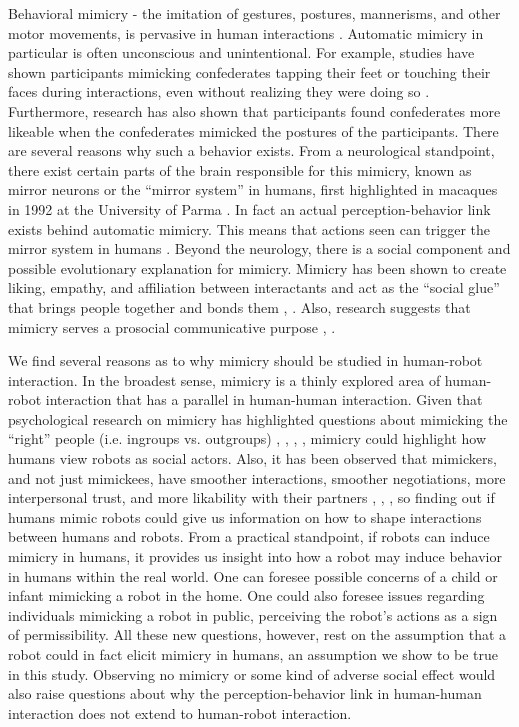 \documentclass{acm_proc_article-sp}
\begin{document}
Behavioral mimicry - the imitation of gestures, postures, mannerisms, and other motor movements, is pervasive in human interactions \cite{chartrand2013antecedents}. Automatic mimicry in particular is often unconscious and unintentional. For example, studies have shown participants mimicking confederates tapping their feet or touching their faces during interactions, even without realizing they were doing so \cite{chartrand1999chameleon}. Furthermore, research has also shown that participants found confederates more likeable when the confederates mimicked the postures of the participants. There are several reasons why such a behavior exists. From a neurological standpoint, there exist certain parts of the brain responsible for this mimicry, known as mirror neurons or the ``mirror system'' in humans, first highlighted in macaques in 1992 at the University of Parma \cite{ehrenfeld2011reflections}. In fact an actual perception-behavior link exists behind automatic mimicry. This means that actions seen can trigger the mirror system in humans \cite{chartrand1999chameleon}. Beyond the neurology, there is a social component and possible evolutionary explanation for mimicry. Mimicry has been shown to create liking, empathy, and affiliation between interactants and act as the ``social glue'' that brings people together and bonds them \cite{chartrand2013antecedents}, \cite{lakin2003chameleon}. Also, research suggests that mimicry serves a prosocial communicative purpose \cite{bavelas1986show}, \cite{chartrand2013antecedents}.

We find several reasons as to why mimicry should be studied in human-robot interaction. In the broadest sense, mimicry is a thinly explored area of human-robot interaction that has a parallel in human-human interaction. Given that psychological research on mimicry has highlighted questions about mimicking the ``right'' people (i.e. ingroups vs. outgroups) \cite{bourgeois2008impact}, \cite{chartrand2013antecedents}, \cite{kavanagh2011s}, \cite{yabar2006implicit}, mimicry could highlight how humans view robots as social actors. Also, it has been observed that mimickers, and not just mimickees, have smoother interactions, smoother negotiations, more interpersonal trust, and more likability with their partners \cite{maddux2008chameleons}, \cite{stel2010mimicry}, \cite{swaab2011early}, so finding out if humans mimic robots could give us information on how to shape interactions between humans and robots. From a practical standpoint, if robots can induce mimicry in humans, it provides us insight into how a robot may induce behavior in humans within the real world. One can foresee possible concerns of a child or infant mimicking a robot in the home. One could also foresee issues regarding individuals mimicking a robot in public, perceiving the robot's actions as a sign of permissibility. All these new questions, however, rest on the assumption that a robot could in fact elicit mimicry in humans, an assumption we show to be true in this study. Observing no mimicry or some kind of adverse social effect would also raise questions about why the perception-behavior link in human-human interaction does not extend to human-robot interaction.
\end{document}
